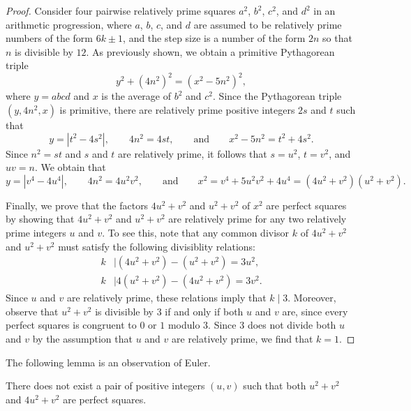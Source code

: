 \begin{proof}
  Consider four pairwise relatively prime squares $a^2$, $b^2$, $c^2$, and $d^2$ in an arithmetic progression, where $a$, $b$, $c$, and $d$ are assumed to be relatively prime numbers of the form $6k\pm 1$, and the step size is a number of the form $2n$ so that $n$ is divisible by $12$. As previously shown, we obtain a primitive Pythagorean triple
  \begin{equation*}
    y^2+(4n^2)^2=(x^2-5n^2)^2,
  \end{equation*}
  where $y=abcd$ and $x$ is the average of $b^2$ and $c^2$.
  Since the Pythagorean triple $(y,4n^2,x)$ is primitive, there are relatively prime positive integers $2s$ and $t$ such that
  \begin{equation*}
    y=|t^2-4s^2|,\qquad 4n^2=4st,\qquad\text{and}\qquad x^2-5n^2=t^2+4s^2.
  \end{equation*}
  Since $n^2=st$ and $s$ and $t$ are relatively prime, it follows that $s=u^2$, $t=v^2$, and $uv=n$. We obtain that
  \begin{equation*}
    y=|v^4-4u^4|,\qquad 4n^2=4u^2v^2,\qquad\text{and}\qquad x^2=v^4+5u^2v^2+4u^4=(4u^2+v^2)(u^2+v^2).
  \end{equation*}

  Finally, we prove that the factors $4u^2+v^2$ and $u^2+v^2$ of $x^2$ are perfect squares by showing that $4u^2+v^2$ and $u^2+v^2$ are relatively prime for any two relatively prime integers $u$ and $v$. To see this, note that any common divisor $k$ of $4u^2+v^2$ and $u^2+v^2$ must satisfy the following divisiblity relations:
  \begin{align*}
    k & \mid (4u^2+v^2) - (u^2+v^2) = 3u^2, \\
    k & \mid 4(u^2+v^2)-(4u^2+v^2) = 3v^2.
  \end{align*}
  Since $u$ and $v$ are relatively prime, these relations imply that $k\mid 3$. Moreover, observe that $u^2+v^2$ is divisible by $3$ if and only if both $u$ and $v$ are, since every perfect squares is congruent to $0$ or $1$ modulo $3$. Since $3$ does not divide both $u$ and $v$ by the assumption that $u$ and $v$ are relatively prime, we find that $k=1$.
\end{proof}

The following lemma is an observation of Euler.

\begin{lemma}\label{lemma:fermat-euler}
  There does not exist a pair of positive integers $(u,v)$ such that both $u^2+v^2$ and $4u^2+v^2$ are perfect squares.
\end{lemma}

